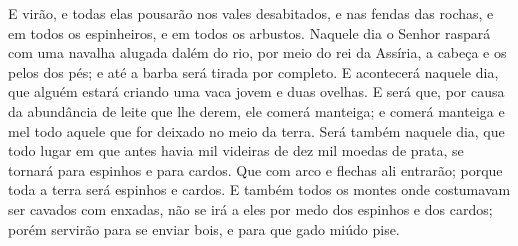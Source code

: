{E virão, e todas elas pousarão nos vales desabitados, e nas fendas das rochas, e em todos os espinheiros, e em todos os arbustos.
Naquele dia o Senhor raspará com uma navalha alugada dalém do rio, por meio do rei da Assíria, a cabeça e os pelos dos pés; e até a barba será tirada por completo.
E acontecerá naquele dia, que alguém estará criando uma vaca jovem e duas ovelhas.
E será que, por causa da abundância de leite que lhe derem, ele comerá manteiga; e comerá manteiga e mel todo aquele que for deixado no meio da terra.
Será também naquele dia, que todo lugar em que antes havia mil videiras
{} de dez mil moedas de prata, se tornará
{} para espinhos e para cardos.
Que com arco e flechas ali entrarão; porque toda a terra será espinhos e cardos.
E também todos os montes onde costumavam ser cavados com enxadas, não se irá a eles por medo dos espinhos e dos cardos; porém servirão para se enviar bois, e para que gado miúdo pise.

}
